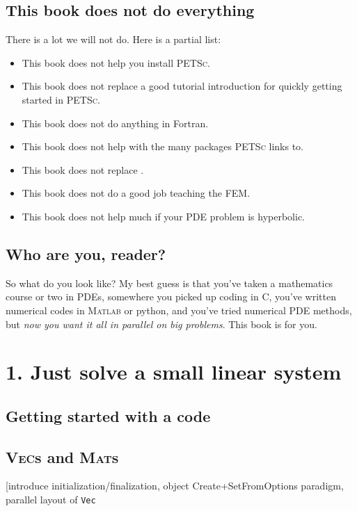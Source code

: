 \documentclass{tufte-book}
\newcommand{\trueinput}[2]{
\VerbatimInput[frame=single,framesep=3mm,label=\fbox{\normalsize \textsl{\,#1\,}},fontfamily=courier,fontsize=\footnotesize]{#2}
}
\newcommand{\cinput}[2]{
\begin{figure*}
\vspace{0.8cm}
\trueinput{#1}{fakeinput.c}
\vspace{0.5cm}
\caption{#2}
\end{figure*}
}
\newcommand{\Matlab}{\textsc{Matlab}\xspace}
\newcommand{\PETSc}{\textsc{PETSc}\xspace}
\newcommand{\pVec}{{\Large\texttt{Vec}}}
\begin{document}
\section{This book does not do everything}  There is a lot we will not do.  Here is a partial list:\begin{itemize}
\item This book does not help you install \PETSc.
\item This book does not replace a good tutorial introduction for quickly getting started in \PETSc.
\item This book does not do anything in Fortran.
\item This book does not help with the many packages \PETSc links to.
\item This book does not replace \citep{Smithetal1996}.
\item This book does not do a good job teaching the FEM.
\item This book does not help much if your PDE problem is hyperbolic.
\end{itemize}


\section{Who are you, reader?}  

So what do you look like? My best guess is that you've taken a mathematics course or two in PDEs, somewhere you picked up coding in C, you've written numerical codes in \Matlab or python, and you've tried numerical PDE methods, but \emph{now you want it all in parallel on big problems}.  This book is for you.


\mainmatter


\chapter{1. Just solve a small linear system}

\section{Getting started with a code}

\cinput{c1matvec.c}{demonstrates \PETSc code basics}

\section{\textsc{Vec}s and \textsc{Mat}s}  [introduce initialization/finalization, object Create+SetFromOptions paradigm, parallel layout of \pVec
\end{document}
